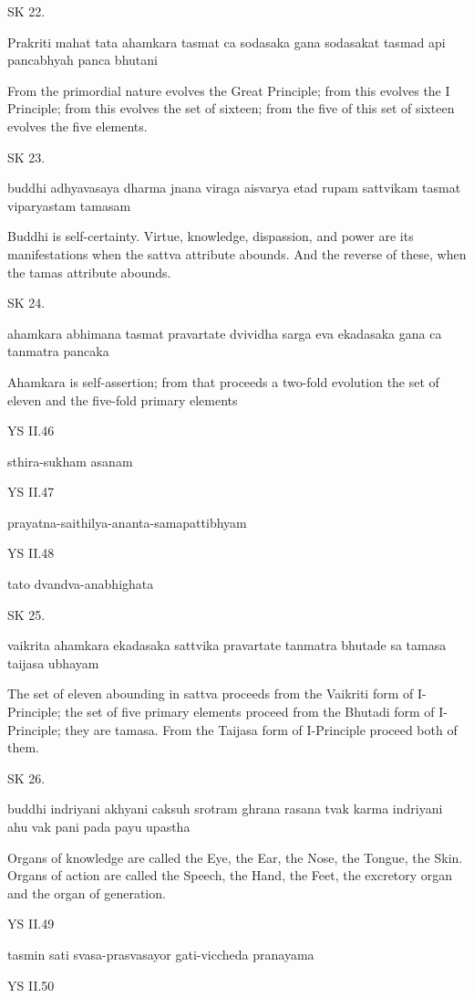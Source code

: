 
SK 22.

Prakriti mahat tata ahamkara tasmat ca sodasaka gana 
sodasakat tasmad api pancabhyah panca bhutani

From the primordial nature evolves the Great Principle;
from this evolves the I Principle;
from this evolves the set of sixteen;
from the five of this set of sixteen evolves the five elements.

SK 23.

buddhi adhyavasaya dharma jnana viraga aisvarya
etad rupam sattvikam tasmat viparyastam tamasam

Buddhi is self-certainty.
Virtue, knowledge, dispassion, and power are its manifestations
when the sattva attribute abounds.
And the reverse of these, when the tamas attribute abounds.

SK 24.

ahamkara abhimana tasmat pravartate dvividha sarga eva
ekadasaka gana ca tanmatra pancaka

Ahamkara is self-assertion;
from that proceeds a two-fold evolution
the set of eleven and the five-fold primary elements

YS II.46

    sthira-sukham asanam
    
YS II.47

    prayatna-saithilya-ananta-samapattibhyam

YS II.48
    
    tato dvandva-anabhighata

SK 25.

vaikrita ahamkara ekadasaka sattvika pravartate
tanmatra bhutade sa tamasa taijasa ubhayam

The set of eleven abounding in sattva proceeds from the Vaikriti form of I-Principle;
the set of five primary elements proceed from the Bhutadi form of I-Principle; they are tamasa.
From the Taijasa form of I-Principle proceed both of them.

SK 26.

buddhi indriyani akhyani caksuh srotram ghrana rasana tvak 
karma indriyani ahu vak pani pada payu upastha

Organs of knowledge are called the Eye, the Ear, the Nose, the Tongue, the Skin.
Organs of action are called the Speech, the Hand, the Feet, the excretory organ and the organ of generation.

YS II.49

    tasmin sati svasa-prasvasayor gati-viccheda pranayama

YS II.50

